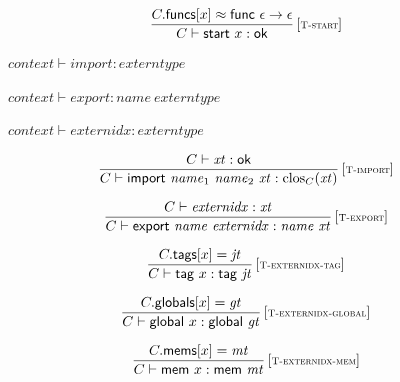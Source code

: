 $$
\begin{array}{@{}c@{}}\displaystyle
\frac{
C{.}\mathsf{funcs}{}[x] \approx \mathsf{func}~\epsilon \rightarrow \epsilon
}{
C \vdash \mathsf{start}~x : \mathsf{ok}
} \, {[\textsc{\scriptsize T{-}start}]}
\qquad
\end{array}
$$

\vspace{1ex}

$\boxed{{\mathit{context}} \vdash {\mathit{import}} : {\mathit{externtype}}}$

$\boxed{{\mathit{context}} \vdash {\mathit{export}} : {\mathit{name}}~{\mathit{externtype}}}$

$\boxed{{\mathit{context}} \vdash {\mathit{externidx}} : {\mathit{externtype}}}$

$$
\begin{array}{@{}c@{}}\displaystyle
\frac{
C \vdash {\mathit{xt}} : \mathsf{ok}
}{
C \vdash \mathsf{import}~{\mathit{name}}_1~{\mathit{name}}_2~{\mathit{xt}} : {{\mathrm{clos}}}_{C}({\mathit{xt}})
} \, {[\textsc{\scriptsize T{-}import}]}
\qquad
\end{array}
$$

$$
\begin{array}{@{}c@{}}\displaystyle
\frac{
C \vdash {\mathit{externidx}} : {\mathit{xt}}
}{
C \vdash \mathsf{export}~{\mathit{name}}~{\mathit{externidx}} : {\mathit{name}}~{\mathit{xt}}
} \, {[\textsc{\scriptsize T{-}export}]}
\qquad
\end{array}
$$

\vspace{1ex}

$$
\begin{array}{@{}c@{}}\displaystyle
\frac{
C{.}\mathsf{tags}{}[x] = {\mathit{jt}}
}{
C \vdash \mathsf{tag}~x : \mathsf{tag}~{\mathit{jt}}
} \, {[\textsc{\scriptsize T{-}externidx{-}tag}]}
\qquad
\end{array}
$$

$$
\begin{array}{@{}c@{}}\displaystyle
\frac{
C{.}\mathsf{globals}{}[x] = {\mathit{gt}}
}{
C \vdash \mathsf{global}~x : \mathsf{global}~{\mathit{gt}}
} \, {[\textsc{\scriptsize T{-}externidx{-}global}]}
\qquad
\end{array}
$$

$$
\begin{array}{@{}c@{}}\displaystyle
\frac{
C{.}\mathsf{mems}{}[x] = {\mathit{mt}}
}{
C \vdash \mathsf{mem}~x : \mathsf{mem}~{\mathit{mt}}
} \, {[\textsc{\scriptsize T{-}externidx{-}mem}]}
\qquad
\end{array}
$$

